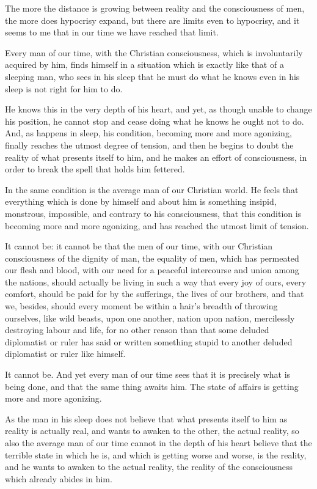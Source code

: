 \documentclass{book}
\begin{document}
The more the distance is growing between reality and the consciousness of men, the more does hypocrisy expand, but there are limits even to hypocrisy, and it seems to me that in our time we have reached that limit.

Every man of our time, with the Christian consciousness, which is involuntarily acquired by him, finds himself in a situation which is exactly like that of a sleeping man, who sees in his sleep that he must do what he knows even in his sleep is not right for him to do.

He knows this in the very depth of his heart, and yet, as though unable to change his position, he cannot stop and cease doing what he knows he ought not to do. And, as happens in sleep, his condition, becoming more and more agonizing, finally reaches the utmost degree of tension, and then he begins to doubt the reality of what presents itself to him, and he makes an effort of consciousness, in order to break the spell that holds him fettered.

In the same condition is the average man of our Christian world. He feels that everything which is done by himself and about him is something insipid, monstrous, impossible, and contrary to his consciousness, that this condition is becoming more and more agonizing, and has reached the utmost limit of tension.

It cannot be: it cannot be that the men of our time, with our Christian consciousness of the dignity of man, the equality of men, which has permeated our flesh and blood, with our need for a peaceful intercourse and union among the nations, should actually be living in such a way that every joy of ours, every comfort, should be paid for by the sufferings, the lives of our brothers, and that we, besides, should every moment be within a hair’s breadth of throwing ourselves, like wild beasts, upon one another, nation upon nation, mercilessly destroying labour and life, for no other reason than that some deluded diplomatist or ruler has said or written something stupid to another deluded diplomatist or ruler like himself.

It cannot be. And yet every man of our time sees that it is precisely what is being done, and that the same thing awaits him. The state of affairs is getting more and more agonizing.

As the man in his sleep does not believe that what presents itself to him as reality is actually real, and wants to awaken to the other, the actual reality, so also the average man of our time cannot in the depth of his heart believe that the terrible state in which he is, and which is getting worse and worse, is the reality, and he wants to awaken to the actual reality, the reality of the consciousness which already abides in him.
\end{document}

